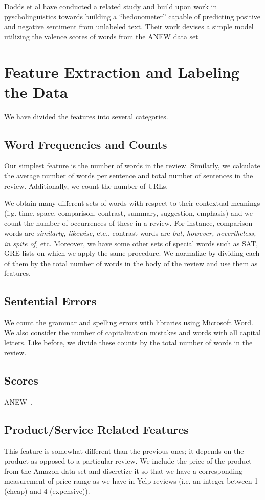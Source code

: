 \documentclass[letterpaper]{article}
\begin{document}
Dodds et al \cite{DoddsANEWPaper} have conducted a related study and build upon work in 
pyscholinguistics towards building a ``hedonometer'' capable of predicting positive 
and negative sentiment from unlabeled text.  Their work devises a simple model utilizing the 
valence scores of words from the ANEW data set

\section{Feature Extraction and Labeling the Data}
We have divided the features into several categories.
\subsection{Word Frequencies and Counts}
Our simplest feature is the number of words in the review. Similarly,
we calculate the average number of words per sentence and total number
of sentences in the review. Additionally, we count the number of URLs.

We obtain many different sets of words with respect to their
contextual meanings (i.g. time, space, comparison, contrast, summary,
suggestion, emphasis) and we count the number of occurrences of these
in a review. For instance, comparison words are \emph{similarly,
  likewise,} etc., contrast words are \emph{but, however,
  nevertheless, in spite of,} etc. Moreover, we have some other sets
of special words such as SAT, GRE lists on which we apply the same
procedure.  We normalize by dividing each of them by the total number
of words in the body of the review and use them as features.

\subsection{Sentential Errors}
We count the grammar and spelling errors with libraries using
Microsoft Word. We also consider the number of capitalization
mistakes and words with all capital letters. Like before, we divide
these counts by the total number of words in the review.

\subsection{Scores}
ANEW~\cite{DoddsANEWPaper}.

\subsection{Product/Service Related Features} 
This feature is somewhat different than the previous ones; it depends
on the product as opposed to a particular review. We include the price
of the product from the Amazon data set and discretize it so that we
have a corresponding measurement of price range as we have in Yelp
reviews (i.e. an integer between 1 (cheap) and 4 (expensive)).
\end{document}
